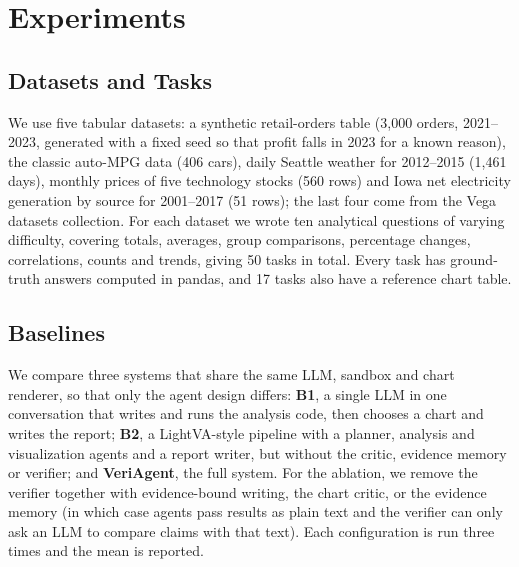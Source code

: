 \documentclass[conference]{IEEEtran}
\begin{document}
\section{Experiments}

\subsection{Datasets and Tasks}
We use five tabular datasets: a synthetic retail-orders table (3,000 orders, 2021--2023, generated with a fixed seed so that profit falls in 2023 for a known reason), the classic auto-MPG data (406 cars), daily Seattle weather for 2012--2015 (1,461 days), monthly prices of five technology stocks (560 rows) and Iowa net electricity generation by source for 2001--2017 (51 rows); the last four come from the Vega datasets collection. For each dataset we wrote ten analytical questions of varying difficulty, covering totals, averages, group comparisons, percentage changes, correlations, counts and trends, giving 50 tasks in total. Every task has ground-truth answers computed in pandas, and 17 tasks also have a reference chart table.

\subsection{Baselines}
We compare three systems that share the same LLM, sandbox and chart renderer, so that only the agent design differs: \textbf{B1}, a single LLM in one conversation that writes and runs the analysis code, then chooses a chart and writes the report; \textbf{B2}, a LightVA-style pipeline \cite{zhao2024lightva} with a planner, analysis and visualization agents and a report writer, but without the critic, evidence memory or verifier; and \textbf{VeriAgent}, the full system. For the ablation, we remove the verifier together with evidence-bound writing, the chart critic, or the evidence memory (in which case agents pass results as plain text and the verifier can only ask an LLM to compare claims with that text). Each configuration is run three times and the mean is reported.
\end{document}
